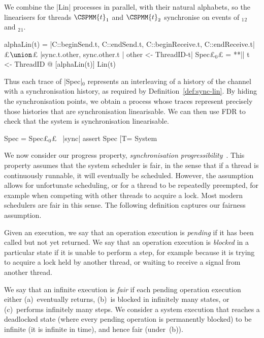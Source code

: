We combine the |Lin| processes in parallel, with their natural
alphabets, so the linearisers for threads $\CSPMM{t}_1$ and $\CSPMM{t}_2$
synchronise on events of $_1$$_2$ and
$_2$$_1$.  
%
\begin{cspm}
alphaLin(t) =
  {|C::beginSend.t, C::endSend.t, C::beginReceive.t, C::endReceive.t|} £$\union$£
  {|sync.t.other, sync.other.t | other <- ThreadID-{t}|}
Spec£$_0$£ = **|| t <- ThreadID @ [alphaLin(t)] Lin(t)
\end{cspm} %
%
Thus each trace of |Spec|$_0$ represents an interleaving of a history of the
channel with a synchronisation history, as required by
Definition~\ref{def:sync-lin}.  By hiding the synchronisation points, we
obtain a process whose traces represent precisely those histories that are
synchronisation linearisable.  We can then use FDR to check that the system is
synchronisation linearisable.
%
\begin{cspm}
Spec = Spec£$_0$£ \ {|sync|}
assert Spec [T= System
\end{cspm}



We now consider our progress property, \emph{synchronisation
  progressibility}~\cite{LL:synchronisation}.  This property assumes that the
system scheduler is fair, in the sense that if a thread is continuously
runnable, it will eventually be scheduled.  However, the assumption allows for
unfortunate scheduling, or for a thread to be repeatedly preempted, for
example when competing with other threads to acquire a lock.  Most modern
schedulers are fair in this sense.
The following definition captures our fairness assumption.
%
\begin{definition}
Given an execution, we say that an operation execution is \emph{pending} if it
has been called but not yet returned.  We say that an operation execution is
\emph{blocked} in a particular state if it is unable to perform a step, for
example because it is trying to acquire a lock held by another thread, or
waiting to receive a signal from another thread.

We say that an infinite execution is \emph{fair} if each pending operation
execution either (a)~eventually returns, (b)~is blocked in infinitely many
states, or (c)~performs infinitely many steps.  We consider a system execution
that reaches a deadlocked state (where every pending operation is permanently
blocked) to be infinite (it is infinite in time), and hence fair (under~(b)).
\end{definition}

